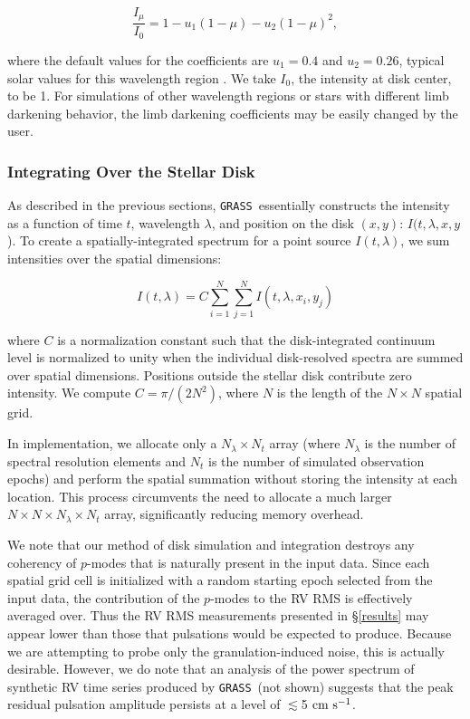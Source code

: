 \documentclass[twocolumn]{aastex63}
\newcommand{\cms}{\ {\rm cm\ s}^{-1}}
\newcommand{\grass}{\texttt{GRASS}}
\newcommand{\revise}[1]{#1}
\begin{document}
\begin{equation}
\frac{I_\mu}{I_0} = 1 - u_1 (1-\mu) - u_2 (1-\mu)^2, 
\end{equation}

\noindent where the default values for the coefficients are $u_1 = 0.4$ and $u_2 = 0.26$, typical solar values for this wavelength region \citep[as verified via][]{Southworth2015}. We take $I_0$, the intensity at disk center, to be 1. For simulations of other wavelength regions or stars with different limb darkening behavior, the limb darkening coefficients may be easily changed by the user. \par 

\subsubsection{Integrating Over the Stellar Disk} \label{sec:disk_int}
As described in the previous sections, \grass\ essentially constructs the intensity as a function of time $t$, wavelength $\lambda$, and position on the disk $(x, y)$: $I(t, \lambda, x, y$).  To create a spatially-integrated spectrum for a point source $I(t, \lambda)$, we sum intensities over the spatial dimensions:

\begin{equation}
    I(t, \lambda) = C \sum_{i=1}^N\sum_{j=1}^N  I(t, \lambda, x_{i}, y_{j})
\end{equation}

\noindent where $C$ is a normalization constant such that the disk-integrated continuum level is normalized to unity when the individual disk-resolved spectra are summed over spatial dimensions. Positions outside the stellar disk contribute zero intensity. We compute $C = \pi / (2N^2)$, where $N$ is the length of the $N \times N$ spatial grid. \par

In implementation, we allocate only a $N_\lambda \times N_t$ array (where $N_\lambda$ is the number of spectral resolution elements and $N_t$ is the number of simulated observation epochs) and perform the spatial summation without storing the intensity at each location. This process circumvents the need to allocate a much larger $N\times N\times N_\lambda \times N_t$ array, significantly reducing memory overhead. \par 

We note that our method of disk simulation and integration destroys any coherency of $p$-modes that is naturally present in the input data. Since each spatial grid cell is initialized with a random starting epoch selected from the input data, the contribution of the $p$-modes to the RV RMS is effectively averaged over. Thus the RV RMS measurements presented in \S\ref{results} may appear lower than those that pulsations would be expected to produce. Because we are attempting to probe only the granulation-induced noise, this is actually desirable. \revise{However, we do note that an analysis of the power spectrum of synthetic RV time series produced by \grass\ (not shown) suggests that the peak residual pulsation amplitude persists at a level of $\lesssim$5$\cms$.} \par 
\end{document}
